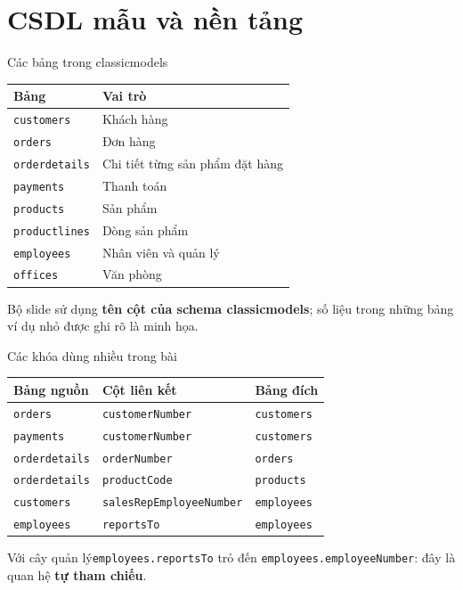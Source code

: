 \documentclass[aspectratio=169,10pt]{beamer}
\newcommand{\code}[1]{\texttt{#1}}
\begin{document}
\section{CSDL mẫu và nền tảng}

\begin{frame}[fragile]{Các bảng trong classicmodels}
\small
\begin{center}
\begin{tabular}{l p{7.2cm}}
\toprule
Bảng & Vai trò \\
\midrule
\code{customers} & Khách hàng \\
\code{orders} & Đơn hàng \\
\code{orderdetails} & Chi tiết từng sản phẩm đặt hàng \\
\code{payments} & Thanh toán \\
\code{products} & Sản phẩm \\
\code{productlines} & Dòng sản phẩm \\
\code{employees} & Nhân viên và quản lý \\
\code{offices} & Văn phòng \\
\bottomrule
\end{tabular}
\end{center}
\vspace{.25em}
\small Bộ slide sử dụng \textbf{tên cột của schema classicmodels}; số liệu trong những bảng ví dụ nhỏ được ghi rõ là minh họa.
\end{frame}

\begin{frame}[fragile]{Các khóa dùng nhiều trong bài}
\small
\begin{center}
\begin{tabular}{l l l}
\toprule
Bảng nguồn & Cột liên kết & Bảng đích \\
\midrule
\code{orders} & \code{customerNumber} & \code{customers} \\
\code{payments} & \code{customerNumber} & \code{customers} \\
\code{orderdetails} & \code{orderNumber} & \code{orders} \\
\code{orderdetails} & \code{productCode} & \code{products} \\
\code{customers} & \code{salesRepEmployeeNumber} & \code{employees} \\
\code{employees} & \code{reportsTo} & \code{employees} \\
\bottomrule
\end{tabular}
\end{center}
\vspace{.25em}
\begin{block}{Với cây quản lý}\code{employees.reportsTo} trỏ đến \code{employees.employeeNumber}: đây là quan hệ \textbf{tự tham chiếu}.\end{block}
\end{frame}
\end{document}
